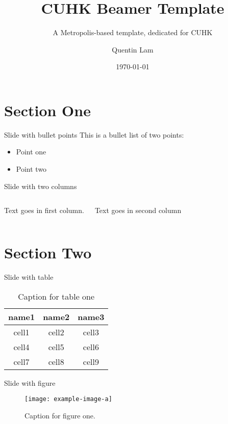 \documentclass{beamer}
\title{CUHK Beamer Template}
\subtitle{A Metropolis-based template, dedicated for CUHK}
\date{\today}
\author{Quentin Lam}
\institute{Department of Psychology, the Chinese University of Hong Kong}
\begin{document}
    \maketitle
    \tableofcontents

    \section{Section One}
    \begin{frame}{Slide with bullet points}
        This is a bullet list of two points:
        \begin{itemize}
            \item Point one
            \item Point two
        \end{itemize}
    \end{frame}

    \begin{frame}{Slide with two columns}
        \begin{columns}
            Text goes in first column.
            
            Text goes in second column
        \end{columns}
    \end{frame}

    \section{Section Two}

    \begin{frame}{Slide with table}
        \begin{table}
            \centering
            \begin{tabular}{ccc}
                \hline
                \textbf{name1} & \textbf{name2} & \textbf{name3} \\
                \hline 
                cell1 & cell2 & cell3 \\ 
                cell4 & cell5 & cell6 \\ 
                cell7 & cell8 & cell9 \\ 
                \hline
            \end{tabular}
            \caption{Caption for table one}
            \label{tab:table1}
        \end{table}
    \end{frame}

    \begin{frame}{Slide with figure}
        \begin{figure}[H]
            \centering
            \texttt{[image: example-image-a]}
            \caption{Caption for figure one.}
            \label{fig:figure1}
        \end{figure}
    \end{frame}
\end{document}
